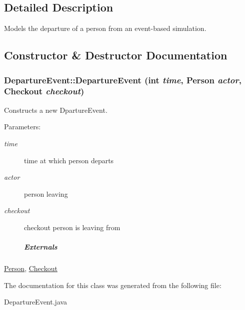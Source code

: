 \subsection{Detailed Description}
Models the departure of a person from an event-based simulation. 

\subsection{Constructor \& Destructor Documentation}
\hypertarget{class_departure_event_644fdd9d98f1aed31a3b7e1ef12729d6}{
\subsubsection[{DepartureEvent}]{\setlength{\rightskip}{0pt plus 5cm}DepartureEvent::DepartureEvent (int {\em time}, \/  {\bf Person} {\em actor}, \/  {\bf Checkout} {\em checkout})}}
\label{class_departure_event_644fdd9d98f1aed31a3b7e1ef12729d6}


Constructs a new DpartureEvent. 

\begin{Desc}
\item[Parameters:]
\begin{description}
\item[{\em time}]time at which person departs \item[{\em actor}]person leaving \item[{\em checkout}]checkout person is leaving from \subparagraph*{Externals}\end{description}
\end{Desc}
\hyperlink{class_person}{Person}, \hyperlink{class_checkout}{Checkout} 

The documentation for this class was generated from the following file:\begin{CompactItemize}
\item 
DepartureEvent.java\end{CompactItemize}
